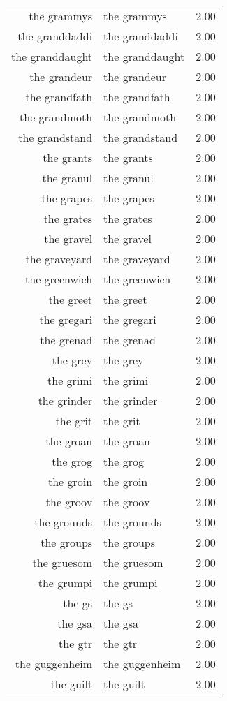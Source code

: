 \begin{table}[ht]
\begin{tabular}{rlr}
  the grammys & the grammys & 2.00 \\ 
  the granddaddi & the granddaddi & 2.00 \\ 
  the granddaught & the granddaught & 2.00 \\ 
  the grandeur & the grandeur & 2.00 \\ 
  the grandfath & the grandfath & 2.00 \\ 
  the grandmoth & the grandmoth & 2.00 \\ 
  the grandstand & the grandstand & 2.00 \\ 
  the grants & the grants & 2.00 \\ 
  the granul & the granul & 2.00 \\ 
  the grapes & the grapes & 2.00 \\ 
  the grates & the grates & 2.00 \\ 
  the gravel & the gravel & 2.00 \\ 
  the graveyard & the graveyard & 2.00 \\ 
  the greenwich & the greenwich & 2.00 \\ 
  the greet & the greet & 2.00 \\ 
  the gregari & the gregari & 2.00 \\ 
  the grenad & the grenad & 2.00 \\ 
  the grey & the grey & 2.00 \\ 
  the grimi & the grimi & 2.00 \\ 
  the grinder & the grinder & 2.00 \\ 
  the grit & the grit & 2.00 \\ 
  the groan & the groan & 2.00 \\ 
  the grog & the grog & 2.00 \\ 
  the groin & the groin & 2.00 \\ 
  the groov & the groov & 2.00 \\ 
  the grounds & the grounds & 2.00 \\ 
  the groups & the groups & 2.00 \\ 
  the gruesom & the gruesom & 2.00 \\ 
  the grumpi & the grumpi & 2.00 \\ 
  the gs & the gs & 2.00 \\ 
  the gsa & the gsa & 2.00 \\ 
  the gtr & the gtr & 2.00 \\ 
  the guggenheim & the guggenheim & 2.00 \\ 
  the guilt & the guilt & 2.00 \\ 

\end{tabular}
\end{table}
